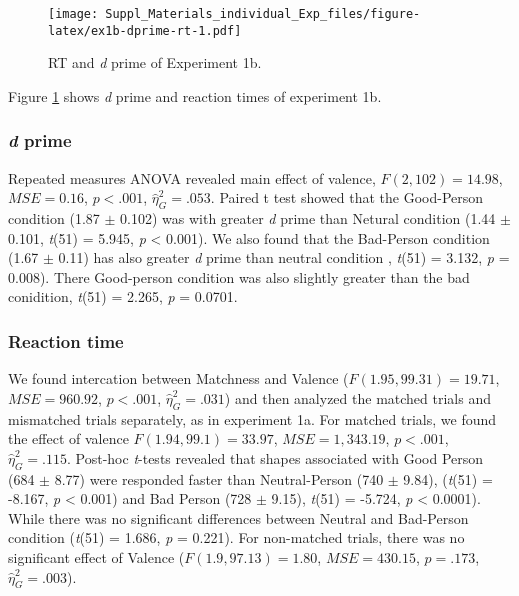 \documentclass[man]{apa6}
\begin{document}
\begin{figure}
\centering
\texttt{[image: Suppl\_Materials\_individual\_Exp\_files/figure-latex/ex1b-dprime-rt-1.pdf]}
\caption{\label{fig:ex1b-dprime-rt}RT and \emph{d} prime of Experiment 1b.}
\end{figure}

Figure \ref{fig:ex1b-dprime-rt} shows \emph{d} prime and reaction times of experiment 1b.

\hypertarget{d-prime-1}{%
\subsubsection{\texorpdfstring{\emph{d} prime}{d prime}}\label{d-prime-1}}

Repeated measures ANOVA revealed main effect of valence, \(F(2, 102) = 14.98\), \(\mathit{MSE} = 0.16\), \(p < .001\), \(\hat{\eta}^2_G = .053\). Paired t test showed that the Good-Person condition (1.87 \(\pm\) 0.102) was with greater \emph{d} prime than Netural condition (1.44 \(\pm\) 0.101, \emph{t}(51) = 5.945, \emph{p} \textless{} 0.001). We also found that the Bad-Person condition (1.67 \(\pm\) 0.11) has also greater \emph{d} prime than neutral condition , \emph{t}(51) = 3.132, \emph{p} = 0.008). There Good-person condition was also slightly greater than the bad conidition, \emph{t}(51) = 2.265, \emph{p} = 0.0701.

\hypertarget{reaction-time-1}{%
\subsubsection{Reaction time}\label{reaction-time-1}}

We found intercation between Matchness and Valence (\(F(1.95, 99.31) = 19.71\), \(\mathit{MSE} = 960.92\), \(p < .001\), \(\hat{\eta}^2_G = .031\)) and then analyzed the matched trials and mismatched trials separately, as in experiment 1a. For matched trials, we found the effect of valence \(F(1.94, 99.1) = 33.97\), \(\mathit{MSE} = 1,343.19\), \(p < .001\), \(\hat{\eta}^2_G = .115\). Post-hoc \emph{t}-tests revealed that shapes associated with Good Person (684 \(\pm\) 8.77) were responded faster than Neutral-Person (740 \(\pm\) 9.84), (\emph{t}(51) = -8.167, \emph{p} \textless{} 0.001) and Bad Person (728 \(\pm\) 9.15), \emph{t}(51) = -5.724, \emph{p} \textless{} 0.0001). While there was no significant differences between Neutral and Bad-Person condition (\emph{t}(51) = 1.686, \emph{p} = 0.221). For non-matched trials, there was no significant effect of Valence (\(F(1.9, 97.13) = 1.80\), \(\mathit{MSE} = 430.15\), \(p = .173\), \(\hat{\eta}^2_G = .003\)).
\end{document}
